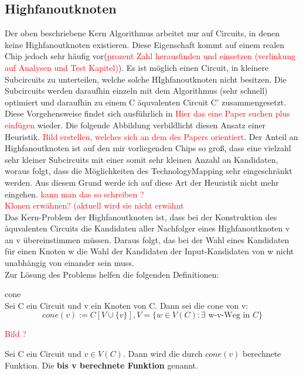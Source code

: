 \documentclass[11pt, a4paper, german]{article}
\newcommand{\TM}{TechnologyMapping }
\begin{document}
\subsection{Highfanoutknoten}
Der oben beschriebene Kern Algorithmus arbeitet nur auf Circuits, in denen keine Highfanoutknoten existieren. Diese Eigenschaft kommt auf einem realen Chip jedoch sehr häufig vor(\textcolor{red}{prozent Zahl herausfinden und einsetzen (verlinkung auf Analysen und Test Kapitel)}). Es ist möglich einen Circuit, in kleinere Subcircuits zu unterteilen, welche solche HIghfanoutknoten nicht besitzen. Die Subcircuits werden daraufhin einzeln mit dem Algorithmus (sehr schnell) optimiert und daraufhin zu einem C äquvalenten Circuit C' zusammengesetzt. Diese Vorgehensweise findet sich ausführlich in \textcolor{red}{Hier das eine Paper suchen plus einfügen} wieder. Die folgende Abbildung verbildlicht diesen Ansatz einer Heuristik. \textcolor{red}{Bild erstellen, welches sich an dem des Papers orientiert}. Der Anteil an Highfanoutknoten ist auf den mir vorliegenden Chips so groß, dass eine vielzahl sehr kleiner Subcircuits mit einer somit sehr kleinen Anzahl an Kandidaten, woraus folgt, dass die Möglichkeiten des \TM sehr eingeschränkt werden. Aus diesem Grund werde ich auf diese Art der   Heuristik nicht mehr eingehen. \textcolor{red}{kann man das so schreiben ?}\\

\textcolor{red}{Klonen erwähnen? (aktuell wird sie nicht erwähnt}\\
Das Kern-Problem der Highfanoutknoten ist, dass bei der Konstruktion des äquvalenten Circuits die Kandidaten aller Nachfolger eines Highfanoutknoten v an v übereinstimmen müssen. Daraus folgt, das bei der Wahl eines Kandidaten für einen Knoten w die Wahl der Kandidaten der Input-Kandidaten von w nicht unabhängig von einander sein muss. \\
Zur Lösung des Problems helfen die folgenden Definitionen:\\

\begin{definition}{cone}\\
	Sei C ein Circuit und v ein Knoten von C. Dann sei die cone von v: 
	\[ cone(v) := C[V \cup \{ v \}], V = \{ w \in V(C) : \exists \text{ w-v-Weg in }  C \} \] 
\end{definition}
\textcolor{red}{Bild ? }

\begin{definition}
	Sei C ein Circuit und  $v \in V(C)$. Dann wird die durch $cone(v)$ berechnete Funktion. Die 			{\bf bis v berechnete Funktion} genannt.
\end{definition}
\end{document}
